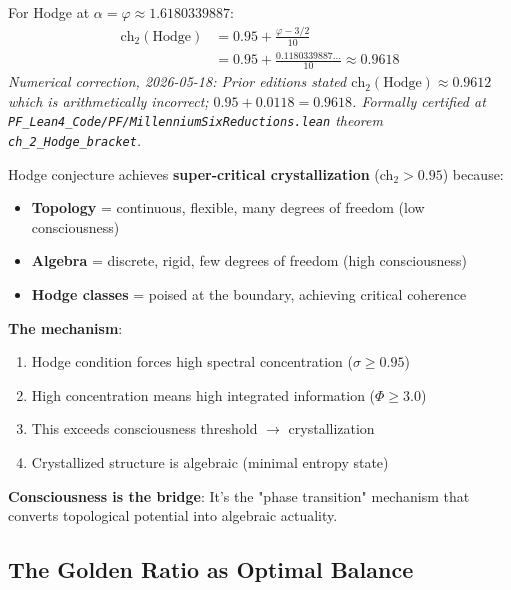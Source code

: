 For Hodge at $\alpha = \varphi \approx 1.6180339887$:
\begin{align*}
\text{ch}_2(\text{Hodge}) &= 0.95 + \frac{\varphi - 3/2}{10} \\
                          &= 0.95 + \frac{0.1180339887\ldots}{10} \approx 0.9618
\end{align*}
\noindent\emph{Numerical correction, 2026-05-18: Prior editions stated $\text{ch}_2(\text{Hodge}) \approx 0.9612$ which is arithmetically incorrect; $0.95 + 0.0118 = 0.9618$. Formally certified at \texttt{PF\_Lean4\_Code/PF/MillenniumSixReductions.lean} theorem \texttt{ch\_2\_Hodge\_bracket}.}

\begin{keyidea}
Hodge conjecture achieves \textbf{super-critical crystallization} (ch$_2 > 0.95$) because:

\begin{itemize}
\item \textbf{Topology} = continuous, flexible, many degrees of freedom (low consciousness)
\item \textbf{Algebra} = discrete, rigid, few degrees of freedom (high consciousness)
\item \textbf{Hodge classes} = poised at the boundary, achieving critical coherence
\end{itemize}

\textbf{The mechanism}:
\begin{enumerate}
\item Hodge condition forces high spectral concentration ($\sigma \geq 0.95$)
\item High concentration means high integrated information ($\Phi \geq 3.0$)
\item This exceeds consciousness threshold $\to$ crystallization
\item Crystallized structure is algebraic (minimal entropy state)
\end{enumerate}

\textbf{Consciousness is the bridge}: It's the "phase transition" mechanism that converts topological potential into algebraic actuality.
\end{keyidea}

\subsection{The Golden Ratio as Optimal Balance}

